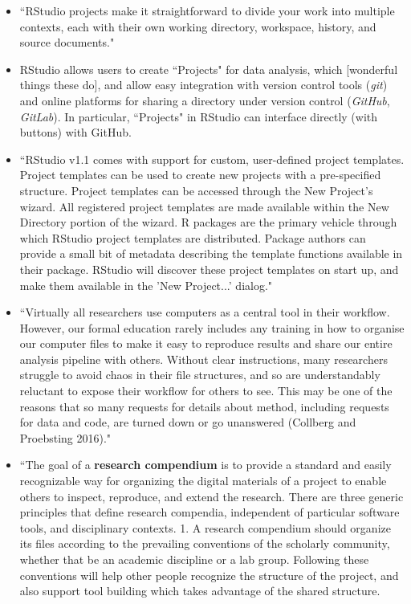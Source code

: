 \documentclass[pdftex,english,11pt,parskip=half]{scrartcl}
\begin{document}
\begin{itemize}
\item ``RStudio projects make it straightforward to divide your work into multiple contexts, each with their own working directory, workspace, history, and source documents." \cite{rstudiousingprojects} 
\item RStudio allows users to create ``Projects" for data analysis, which [wonderful things these do], and allow easy integration with version control tools (\textit{git}) and online platforms for sharing a directory under version control (\textit{GitHub}, \textit{GitLab}). In particular, ``Projects" in RStudio can interface directly (with buttons) with GitHub. 
\item ``RStudio v1.1 comes with support for custom, user-defined project templates. Project templates can be used to create new projects with a pre-specified structure. Project templates can be accessed through the New Project's wizard. All registered project templates are made available within the New Directory portion of the wizard. R packages are the primary vehicle through which RStudio project templates are distributed. Package authors can provide a small bit of metadata describing the template functions available in their package. RStudio will discover these project templates on start up, and make them available in the 'New Project...' dialog." \cite{rstudioprojecttemplate}
\item ``Virtually all researchers use computers as a central tool in their workflow. However, our formal education rarely includes any training in how to organise our computer files to make it easy to reproduce results and share our entire analysis pipeline with others. Without clear instructions, many researchers struggle to avoid chaos in their file structures, and so are understandably reluctant to expose their workflow for others to see. This may be one of the reasons that so many requests for details about method, including requests for data and code, are turned down or go unanswered (Collberg and Proebsting 2016)." \cite{marwick2018packaging}
\item ``The goal of a \textbf{research compendium} is to provide a standard and easily recognizable way for organizing the digital materials of a project to enable others to inspect, reproduce, and extend the research. There are three generic principles that define research compendia, independent of particular software tools, and disciplinary contexts. 1. A research compendium should organize its files according to the prevailing conventions of the scholarly community, whether that be an academic discipline or a lab group. Following these conventions will help other people recognize the structure of the project, and also support tool building which takes advantage of the shared structure.

\end{itemize}
\end{document}
